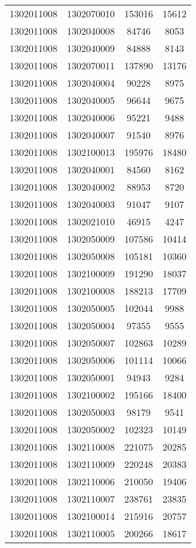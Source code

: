 \begin{longtable}[h]{llcc}
		1302011008 & 1302070010 & 153016 & 15612\\
		1302011008 & 1302040008 & 84746 & 8053\\
		1302011008 & 1302040009 & 84888 & 8143\\
		1302011008 & 1302070011 & 137890 & 13176\\
		1302011008 & 1302040004 & 90228 & 8975\\
		1302011008 & 1302040005 & 96644 & 9675\\
		1302011008 & 1302040006 & 95221 & 9488\\
		1302011008 & 1302040007 & 91540 & 8976\\
		1302011008 & 1302100013 & 195976 & 18480\\
		1302011008 & 1302040001 & 84560 & 8162\\
		1302011008 & 1302040002 & 88953 & 8720\\
		1302011008 & 1302040003 & 91047 & 9107\\
		1302011008 & 1302021010 & 46915 & 4247\\
		1302011008 & 1302050009 & 107586 & 10414\\
		1302011008 & 1302050008 & 105181 & 10360\\
		1302011008 & 1302100009 & 191290 & 18037\\
		1302011008 & 1302100008 & 188213 & 17709\\
		1302011008 & 1302050005 & 102044 & 9988\\
		1302011008 & 1302050004 & 97355 & 9555\\
		1302011008 & 1302050007 & 102863 & 10289\\
		1302011008 & 1302050006 & 101114 & 10066\\
		1302011008 & 1302050001 & 94943 & 9284\\
		1302011008 & 1302100002 & 195166 & 18400\\
		1302011008 & 1302050003 & 98179 & 9541\\
		1302011008 & 1302050002 & 102323 & 10149\\
		1302011008 & 1302110008 & 221075 & 20285\\
		1302011008 & 1302110009 & 220248 & 20383\\
		1302011008 & 1302110006 & 210050 & 19406\\
		1302011008 & 1302110007 & 238761 & 23835\\
		1302011008 & 1302100014 & 215916 & 20757\\
		1302011008 & 1302110005 & 200266 & 18617\\

\end{longtable}
